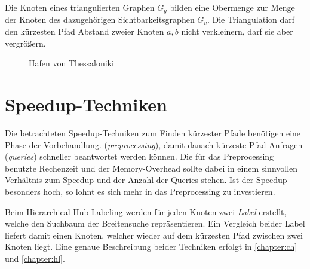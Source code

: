 
Die Knoten eines triangulierten Graphen $G_g$ bilden eine Obermenge zur Menge der Knoten des dazugehörigen Sichtbarkeitsgraphen $G_v$.
Die Triangulation darf den kürzesten Pfad Abstand zweier Knoten $a, b$ nicht verkleinern, darf sie aber vergrößern.


\begin{figure}[ht]%
    \centering
    \caption{Hafen von Thessaloniki}%
    \label{fig:thessaloniki}%
\end{figure}

\section{Speedup-Techniken}

Die betrachteten Speedup-Techniken zum Finden kürzester Pfade benötigen eine Phase der Vorbehandlung. (\emph{preprocessing}), damit danach kürzeste Pfad Anfragen (\emph{queries}) schneller beantwortet werden können.
Die für das Preprocessing benutzte Rechenzeit und der Memory-Overhead sollte dabei in einem sinnvollen Verhältnis zum Speedup und der Anzahl der Queries stehen.
Ist der Speedup besonders hoch, so lohnt es sich mehr in das Preprocessing zu investieren.


Beim Hierarchical Hub Labeling werden für jeden Knoten zwei \emph{Label} erstellt, welche den Suchbaum der Breitensuche repräsentieren.
Ein Vergleich beider Label liefert damit einen Knoten, welcher wieder auf dem kürzesten Pfad zwischen zwei Knoten liegt.
Eine genaue Beschreibung beider Techniken erfolgt in \autoref{chapter:ch} und \autoref{chapter:hl}.





